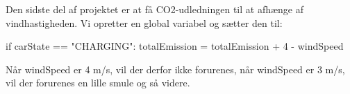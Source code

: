 \documentclass{ucph-handout}
\newcounter{handout}
\begin{document}
\begin{exercisebox}[adjusted title=CO2 udledning]
Den sidste del af projektet er at få CO2-udledningen til at afhænge af
vindhastigheden. Vi opretter en global variabel 
og sætter den til:
\begin{python}
if carState == "CHARGING":
    totalEmission = totalEmission + 4 - windSpeed
\end{python}

\noindent
Når windSpeed er 4 m/s, vil der derfor ikke forurenes, når windSpeed er
3 m/s, vil der forurenes en lille smule og så videre.
\end{exercisebox}









\end{document}
